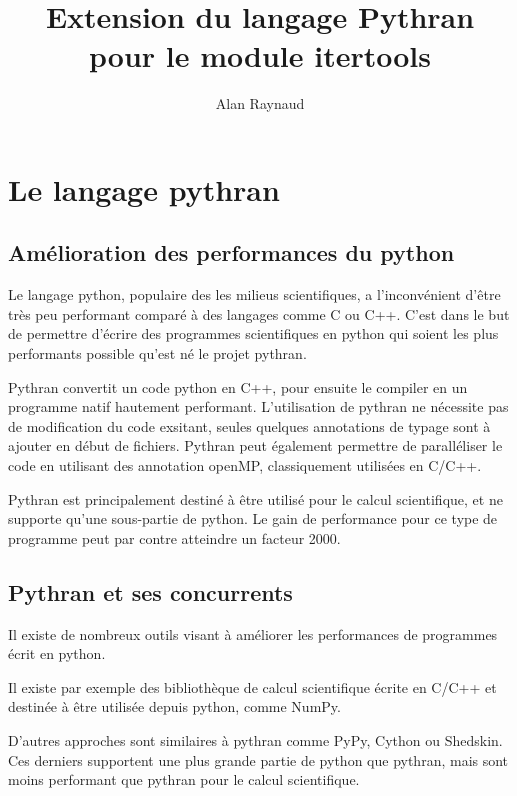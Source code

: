 \documentclass[a4paper]{article}
\title{Extension du langage Pythran pour le module itertools}
\author{Alan Raynaud}
\date{}
\begin{document}

\maketitle   


\clearpage

\section*{Le langage pythran}

\subsection*{Amélioration des performances du python}

Le langage python, populaire des les milieus scientifiques, a
l'inconvénient d'être très peu performant comparé à des langages comme
C ou C++. C'est dans le but de permettre d'écrire des programmes
scientifiques en python qui soient les plus performants possible
qu'est né le projet pythran.

Pythran convertit un code python en C++, pour ensuite le compiler en
un programme natif hautement performant. L'utilisation de pythran ne
nécessite pas de modification du code exsitant, seules quelques
annotations de typage sont à ajouter en début de fichiers. Pythran
peut également permettre de paralléliser le code en utilisant des
annotation openMP, classiquement utilisées en C/C++.

Pythran est principalement destiné à être utilisé pour le calcul
scientifique, et ne supporte qu'une sous-partie de python. Le gain de
performance pour ce type de programme peut par contre atteindre un
facteur 2000.

\subsection*{Pythran et ses concurrents}

Il existe de nombreux outils visant à améliorer les performances de
programmes écrit en python.

Il existe par exemple des bibliothèque de calcul scientifique écrite
en C/C++ et destinée à être utilisée depuis python, comme NumPy.

D'autres approches sont similaires à pythran comme PyPy, Cython ou
Shedskin. Ces derniers supportent une plus grande partie de python que
pythran, mais sont moins performant que pythran pour le calcul
scientifique.
\end{document}
